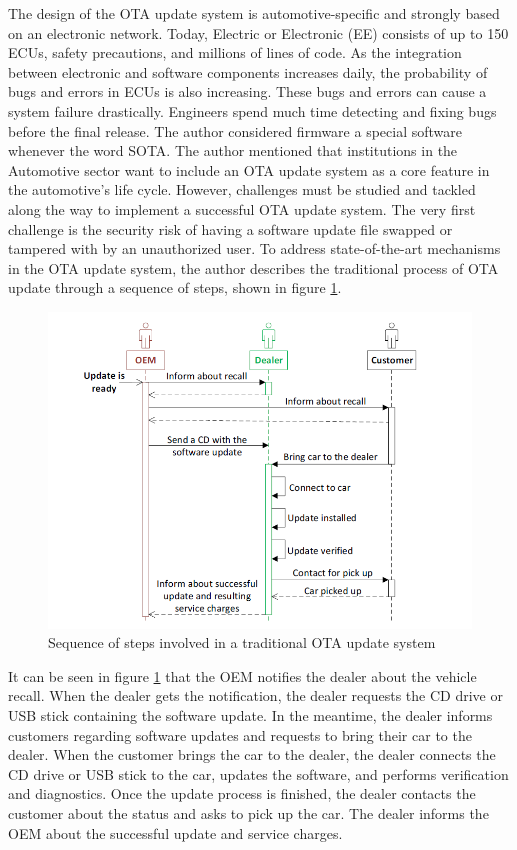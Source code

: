 \documentclass[12pt,a4paper]{article}
\begin{document}
The design of the OTA update system is automotive-specific and strongly based on an electronic network. Today, Electric or Electronic (EE) consists of up to 150 ECUs, safety precautions, and millions of lines of code. As the integration between electronic and software components increases daily, the probability of bugs and errors in ECUs is also increasing. These bugs and errors can cause a system failure drastically. Engineers spend much time detecting and fixing bugs before the final release. The author considered firmware a special software whenever the word SOTA. The author mentioned that institutions in the Automotive sector want to include an OTA update system as a core feature in the automotive's life cycle. However, challenges must be studied and tackled along the way to implement a successful OTA update system. The very first challenge is the security risk of having a software update file swapped or tampered with by an unauthorized user. To address state-of-the-art mechanisms in the OTA update system, the author describes the traditional process of OTA update through a sequence of steps, shown in figure \ref{traditional_sequence}. \cite{r28}

\begin{figure}[H]
\centering
\includegraphics[scale=0.75]{traditional_sequence.PNG}
\caption{Sequence of steps involved in a traditional OTA update system \cite{r28}}
\label{traditional_sequence}
\end{figure}

It can be seen in figure \ref{traditional_sequence} that the OEM notifies the dealer about the vehicle recall. When the dealer gets the notification, the dealer requests the CD drive or USB stick containing the software update. In the meantime, the dealer informs customers regarding software updates and requests to bring their car to the dealer. When the customer brings the car to the dealer, the dealer connects the CD drive or USB stick to the car, updates the software, and performs verification and diagnostics. Once the update process is finished, the dealer contacts the customer about the status and asks to pick up the car. The dealer informs the OEM about the successful update and service charges. \cite{r28} \\
\end{document}
